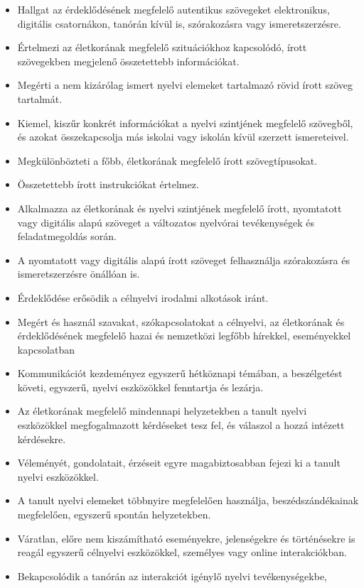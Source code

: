 \begin{itemize}
\item
  Hallgat az érdeklődésének megfelelő autentikus szövegeket
  elektronikus, digitális csatornákon, tanórán kívül is, szórakozásra
  vagy ismeretszerzésre.
\item
  Értelmezi az életkorának megfelelő szituációkhoz kapcsolódó, írott
  szövegekben megjelenő összetettebb információkat.
\item
  Megérti a nem kizárólag ismert nyelvi elemeket tartalmazó rövid írott
  szöveg tartalmát.
\item
  Kiemel, kiszűr konkrét információkat a nyelvi szintjének megfelelő
  szövegből, és azokat összekapcsolja más iskolai vagy iskolán kívül
  szerzett ismereteivel.
\item
  Megkülönbözteti a főbb, életkorának megfelelő írott szövegtípusokat.
\item
  Összetettebb írott instrukciókat értelmez.
\item
  Alkalmazza az életkorának és nyelvi szintjének megfelelő írott,
  nyomtatott vagy digitális alapú szöveget a változatos nyelvórai
  tevékenységek és feladatmegoldás során.
\item
  A nyomtatott vagy digitális alapú írott szöveget felhasználja
  szórakozásra és ismeretszerzésre önállóan is.
\item
  Érdeklődése erősödik a célnyelvi irodalmi alkotások iránt.
\item
  Megért és használ szavakat, szókapcsolatokat a célnyelvi, az
  életkorának és érdeklődésének megfelelő hazai és nemzetközi legfőbb
  hírekkel, eseményekkel kapcsolatban
\item
  Kommunikációt kezdeményez egyszerű hétköznapi témában, a beszélgetést
  követi, egyszerű, nyelvi eszközökkel fenntartja és lezárja.
\item
  Az életkorának megfelelő mindennapi helyzetekben a tanult nyelvi
  eszközökkel megfogalmazott kérdéseket tesz fel, és válaszol a hozzá
  intézett kérdésekre.
\item
  Véleményét, gondolatait, érzéseit egyre magabiztosabban fejezi ki a
  tanult nyelvi eszközökkel.
\item
  A tanult nyelvi elemeket többnyire megfelelően használja,
  beszédszándékainak megfelelően, egyszerű spontán helyzetekben.
\item
  Váratlan, előre nem kiszámítható eseményekre, jelenségekre és
  történésekre is reagál egyszerű célnyelvi eszközökkel, személyes vagy
  online interakciókban.
\item
  Bekapcsolódik a tanórán az interakciót igénylő nyelvi tevékenységekbe,

\end{itemize}
